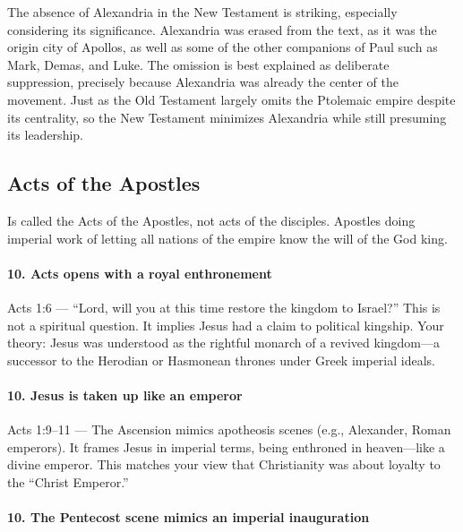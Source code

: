 The absence of Alexandria in the New Testament is striking, especially considering its significance.
Alexandria was erased from the text, as it was the origin city of Apollos, as well as some of the other companions of Paul such as Mark, Demas, and Luke.
The omission is best explained as deliberate suppression, precisely because Alexandria was already the center of the movement.
Just as the Old Testament largely omits the Ptolemaic empire despite its centrality, so the New Testament minimizes Alexandria while still presuming its leadership.

\subsection{Acts of the Apostles}\label{subsec:acts-of-the-apostles}

Is called the Acts of the Apostles, not acts of the disciples.
Apostles doing imperial work of letting all nations of the empire know the will of the God king.

\paragraph{10.
Acts opens with a royal enthronement}\label{par:acts-opens-with-a-royal-enthronement}

Acts 1:6 --- ``Lord, will you at this time restore the kingdom to Israel?'' This is not a spiritual question.
It implies Jesus had a claim to political kingship.
Your theory: Jesus was understood as the rightful monarch of a revived kingdom---a successor to the Herodian or Hasmonean thrones under Greek imperial ideals.

\paragraph{10.
Jesus is taken up like an emperor}\label{par:jesus-is-taken-up-like-an-emperor}

Acts 1:9--11 --- The Ascension mimics apotheosis scenes (e.g., Alexander, Roman emperors).
It frames Jesus in imperial terms, being enthroned in heaven---like a divine emperor.
This matches your view that Christianity was about loyalty to the ``Christ Emperor.''

\paragraph{10.
The Pentecost scene mimics an imperial inauguration}\label{par:the-pentecost-scene-mimics-an-imperial-inauguration}


